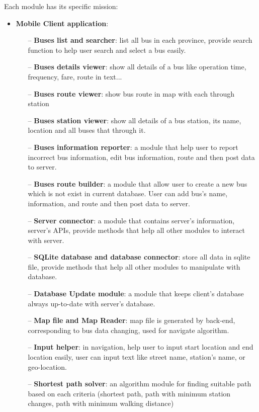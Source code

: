 		Each module has its specific mission:
		\begin{itemize}
			\item \textbf{Mobile Client application}:
				\begin{itemize}
					\item[--] \textbf{Buses list and searcher}: list all bus in each province, provide search function to help user search and select a bus easily.
					\item[--] \textbf{Buses details viewer}: show all details of a bus like operation time, frequency, fare, route in text...
					\item[--] \textbf{Buses route viewer}: show bus route in map with each through station
					\item[--] \textbf{Buses station viewer}: show all details of a bus station, its name, location and all buses that through it.
					\item[--] \textbf{Buses information reporter}: a module that help user to report incorrect bus information, edit bus information, route and then post data to server.
					\item[--] \textbf{Buses route builder}: a module that allow user to create a new bus which is not exist in current database. User can add bus's name, information, and route and then post data to server.
					\item[--] \textbf{Server connector}: a module that contains server's information, server's APIs, provide methods that help all other modules to interact with server.
					\item[--] \textbf{SQLite database and database connector}: store all data in sqlite file, provide methods that help all other modules to manipulate with database.
					\item[--] \textbf{Database Update module}: a module that keeps client's database always up-to-date with server's database.
					\item[--] \textbf{Map file and Map Reader}: map file is generated by back-end, corresponding to bus data changing, used for navigate algorithm.
					\item[--] \textbf{Input helper}: in navigation, help user to input start location and end location easily, user can input text like street name, station's name, or geo-location.
					\item[--] \textbf{Shortest path solver}: an algorithm module for finding suitable path based on each criteria (shortest path, path with minimum station changes, path with minimum walking distance)

\end{itemize}
\end{itemize}

